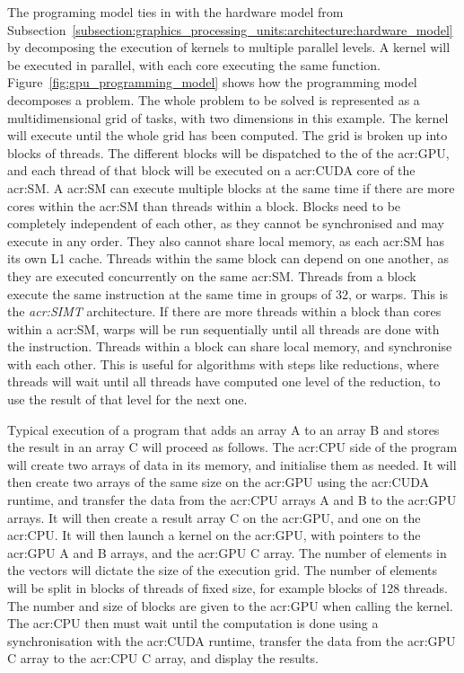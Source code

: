 The programing model ties in with the hardware model from
Subsection~\ref{subsection:graphics_processing_units:architecture:hardware_model} by decomposing the
execution of kernels to multiple parallel levels. A kernel will be executed in parallel, with each
core executing the same function. Figure~\ref{fig:gpu_programming_model} shows how the programming
model decomposes a problem. The whole problem to be solved is represented as a multidimensional grid
of tasks, with two dimensions in this example. The kernel will execute until the whole grid has been
computed. The grid is broken up into blocks of threads. The different blocks will be dispatched to
the  of the \acrshort{acr:GPU}, and each thread of that block will be executed on
a \acrshort{acr:CUDA} core of the \acrshort{acr:SM}. A \acrshort{acr:SM} can execute multiple blocks
at the same time if there are more cores within the \acrshort{acr:SM} than threads within a block.
Blocks need to be completely independent of each other, as they cannot be synchronised and may
execute in any order. They also cannot share local memory, as each \acrshort{acr:SM} has its own L1
cache. Threads within the same block can depend on one another, as they are executed concurrently on
the same \acrshort{acr:SM}. Threads from a block execute the same instruction at the same time in
groups of 32, or warps. This is the \textit{\acrfull{acr:SIMT}} architecture. If there are more
threads within a block than cores within a \acrshort{acr:SM}, warps will be run sequentially until
all threads are done with the instruction. Threads within a block can share local memory, and
synchronise with each other. This is useful for algorithms with steps like reductions, where threads
will wait until all threads have computed one level of the reduction, to use the result of that
level for the next one.

Typical execution of a program that adds an array A to an array B and stores the result in an array
C will proceed as follows. The \acrshort{acr:CPU} side of the program will create two arrays of data
in its memory, and initialise them as needed. It will then create two arrays of the same size on the
\acrshort{acr:GPU} using the \acrshort{acr:CUDA} runtime, and transfer the data from the
\acrshort{acr:CPU} arrays A and B to the \acrshort{acr:GPU} arrays. It will then create a result
array C on the \acrshort{acr:GPU}, and one on the \acrshort{acr:CPU}. It will then launch a kernel
on the \acrshort{acr:GPU}, with pointers to the \acrshort{acr:GPU} A and B arrays, and the
\acrshort{acr:GPU} C array. The number of elements in the vectors will dictate the size of the
execution grid. The number of elements will be split in blocks of threads of fixed size, for example
blocks of 128 threads. The number and size of blocks are given to the \acrshort{acr:GPU} when
calling the kernel. The \acrshort{acr:CPU} then must wait until the computation is done using a
synchronisation with the \acrshort{acr:CUDA} runtime, transfer the data from the \acrshort{acr:GPU}
C array to the \acrshort{acr:CPU} C array, and display the results. 

